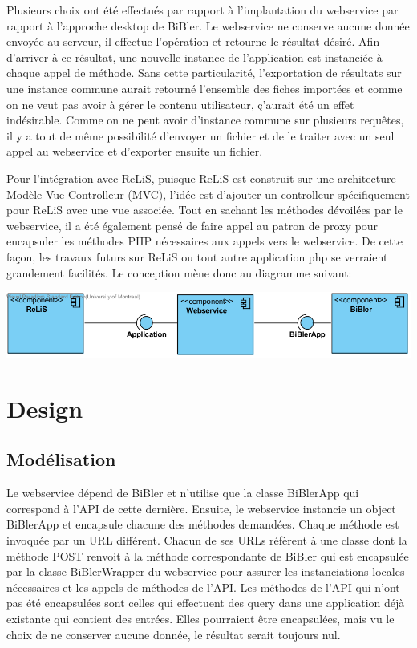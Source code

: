 \documentclass[12pt,titlepage]{article}
\let\oldsection\section
\renewcommand\section{\clearpage\oldsection}
\begin{document}
Plusieurs choix ont été effectués par rapport à l'implantation du webservice par rapport à l'approche desktop de BiBler. Le webservice ne conserve aucune donnée envoyée au serveur, il effectue l'opération et retourne le résultat désiré. Afin d'arriver à ce résultat, une nouvelle instance de l'application est instanciée à chaque appel de méthode. Sans cette particularité, l'exportation de résultats sur une instance commune aurait retourné l'ensemble des fiches importées et comme on ne veut pas avoir à gérer le contenu utilisateur, ç'aurait été un effet indésirable. Comme on ne peut avoir d'instance commune sur plusieurs requêtes, il y a tout de même possibilité d'envoyer un fichier et de le traiter avec un seul appel au webservice et d'exporter ensuite un fichier.\newline

Pour l'intégration avec ReLiS, puisque ReLiS est construit sur une architecture Modèle-Vue-Controlleur (MVC), l'idée est d'ajouter un controlleur spécifiquement pour ReLiS avec une vue associée. Tout en sachant les méthodes dévoilées par le webservice, il a été également pensé de faire appel au patron de proxy pour encapsuler les méthodes PHP nécessaires aux appels vers le webservice. De cette façon, les travaux futurs sur ReLiS ou tout autre application php se verraient grandement facilités. Le conception mène donc au diagramme suivant: 


\includegraphics{DomainClassDiagram.png}


\section{Design}
\subsection{Modélisation}
Le webservice dépend de BiBler et n'utilise que la classe BiBlerApp qui correspond à l'API de cette dernière. Ensuite, le webservice instancie un object BiBlerApp et encapsule chacune des méthodes demandées. Chaque méthode est invoquée par un URL différent. Chacun de ses URLs réfèrent à une classe dont la méthode POST renvoit à la méthode correspondante de BiBler qui est encapsulée par la classe BiBlerWrapper du webservice pour assurer les instanciations locales nécessaires et les appels de méthodes de l'API. Les méthodes de l'API qui n'ont pas été encapsulées sont celles qui effectuent des query dans une application déjà existante qui contient des entrées. Elles pourraient être encapsulées, mais vu le choix de ne conserver aucune donnée, le résultat serait toujours nul. \newline
\end{document}
